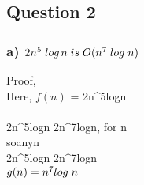 \documentclass[10pt, a4paper]{article}
\begin{document}
    \newpage
	
	\subsection*{Question 2}
	
	\subsubsection*{a) $2n^5\hspace{0.1cm}log\hspace{0.05cm}n\hspace{0.1cm}is\hspace{0.1cm}O(n^7\hspace{0.1cm}log\hspace{0.1cm}n)$}
	Proof,\\
	Here, {$f(n)$} = {2n^5log\hspace{0.1cm}n} \\\\
	{2n^5log\hspace{0.1cm}n \leq 2n^7log\hspace{0.1cm}n}, \hspace{0.5cm} for \hspace{0.2cm} n  \\
	{so\hspace{0.1cm}any\hspace{0.1cm}n } \\
	{2n^5log\hspace{0.1cm}n \leq 2n^7log\hspace{0.1cm}n} \\
	\rightarrow \hspace{0.1cm} $g(n) = n^7log\hspace{0.1cm}n$ 
	
\end{document}
